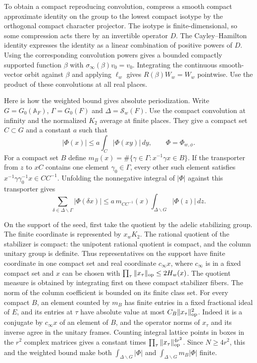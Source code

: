 To obtain a compact reproducing convolution, compress a smooth
compact approximate identity on the group to the lowest compact
isotype by the orthogonal compact character projector. The isotype
is finite-dimensional, so some compression acts there by an invertible
operator \(D\). The Cayley--Hamilton identity expresses the identity
as a linear combination of positive powers of \(D\). Using the
corresponding convolution powers gives a bounded compactly supported
function \(\beta\) with \(\sigma_\infty(\beta)v_0=v_0\). Integrating the
continuous smooth-vector orbit against \(\beta\) and applying \(\ell_w\)
gives \(R(\beta)W_w=W_w\) pointwise. Use the product of these
convolutions at all real places.

Here is how the weighted bound gives absolute periodization.
Write \(G=G_0(\mathbb A_F)\), \(\Gamma=G_0(F)\) and
\(\Delta=\mathcal S_w(F)\). Use the compact convolution at infinity
and the normalized \(K_2\) average at finite places. They give a
compact set \(C\subset G\) and a constant \(a\) such that
\[
 |\Phi(x)|\le a\int_C|\Phi(xy)|\,dy,
 \qquad \Phi=\Phi_{w,\phi}.
\]
For a compact set \(B\) define
\(m_B(x)=\#\{\gamma\in\Gamma:x^{-1}\gamma x\in B\}\).
If the transporter from \(z\) to \(xC\) contains one element
\(\gamma_0\in\Gamma\), every other such element satisfies
\(x^{-1}\gamma\gamma_0^{-1}x\in CC^{-1}\).
Unfolding the nonnegative integral of \(|\Phi|\) against this
transporter gives
\begin{equation}
 \label{eq:period-bessel-absolute-fold}
 \sum_{\delta\in\Delta\backslash\Gamma}|\Phi(\delta x)|
 \le a\,m_{CC^{-1}}(x)\int_{\Delta\backslash G}|\Phi(z)|\,dz .
\end{equation}

On the support of the seed, first take the quotient by the
adelic stabilizing group. The finite coordinate is represented
by \(x_wK_2\). The rational quotient of the stabilizer is compact:
the unipotent rational quotient is compact, and the column
unitary group is definite. Thus representatives on the support
have finite coordinate in one compact set and real coordinate
\(c_\infty x\), where \(c_\infty\) is in a fixed compact set and
\(x\) can be chosen with \(\prod_\tau\|x_\tau\|_{\rm op}\le2H_w(x)\).
The quotient measure is obtained by integrating first on these
compact stabilizer fibers. The norm of the column coefficient
is bounded on its finite class set. For every compact \(B\),
an element counted by \(m_B\) has finite entries in a fixed
fractional ideal of \(E\), and its entries at \(\tau\) have
absolute value at most \(C_B\|x_\tau\|_{\rm op}^2\).
Indeed it is a conjugate by \(c_\infty x\) of an element of \(B\),
and the operator norms of \(x_\tau\) and its inverse agree
in the unitary frames. Counting integral lattice points in boxes
in the \(r^2\) complex matrices gives a constant times
\(\prod_\tau\|x_\tau\|_{\rm op}^{4r^2}\).
Since \(N\ge4r^2\), this and the weighted bound make both
\(\int_{\Delta\backslash G}|\Phi|\) and
\(\int_{\Delta\backslash G}m_B|\Phi|\) finite.

